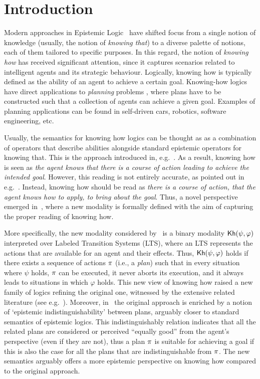 \section{Introduction}
\label{sec:intro}

Modern approaches in Epistemic Logic~\cite{vonWright:1951,Hintikka:1962} have shifted focus from a single notion of knowledge (usually, the notion of \emph{knowing that}) to a diverse palette of notions, each of them tailored to specific purposes. In this regard, the notion of \emph{knowing how} has received significant attention, since it captures scenarios related to intelligent agents and its strategic behaviour. Logically, knowing how is typically defined as the ability of an agent to achieve a certain goal.  Knowing-how logics have direct applications to \emph{planning} problems \cite{Stuart21},  where  plans have to be constructed such that a collection of agents can achieve a given goal.  Examples of planning applications can be found in self-driven cars,  robotics, software engineering, etc.

Usually,  the semantics for knowing how logics can be thought as as a combination of operators that describe abilities alongside standard epistemic operators for knowing that.  This is the approach introduced in, e.g.~\cite{Mccarthy69,Moore85,Les00,Hoek00,HerzigT06}. As a result, knowing how is seen as \emph{the agent knows that there is a course of action leading to achieve the intended goal}. However, this reading is not entirely accurate, as pointed out in e.g.~\cite{JamrogaA07,Herzig15}. Instead, knowing how should be read as \emph{there is a course of action, that the agent knows how to apply, to bring about the goal}. Thus, a novel perspective emerged in~\cite{Wang15lori,Wang16,Wang2016}, where a new modality is formally defined with the aim of capturing the proper reading of knowing how. 

More specifically, the new modality considered by~\cite{Wang15lori,Wang16,Wang2016} is a binary modality ${\mathsf{Kh}}(\psi,\varphi)$ interpreted over Labeled Transition Systems (LTS), where an LTS represents the  actions that are available for an agent and their effects. Thus, ${\mathsf{Kh}}(\psi,\varphi)$ holds if there exists a sequence of actions $\pi$ (i.e., a \emph{plan}) such that in every situation where $\psi$ holds, $\pi$ can be executed, it never aborts its execution, and it always leads to situations in which $\varphi$ holds. This new view of knowing how raised a new family of logics refining the original one, witnessed by the extensive related literature (see e.g.~\cite{LiWang17,Li17,Li17bis,FervariHLW17,LiW21,NaumovT18,NaumovT19,Naumov2018a}). Moreover, in~\cite{AFSVQ21,AFSVQ23} the original approach is enriched by a notion of `epistemic indistinguishability' between plans, arguably closer to standard semantics of epistemic logics. This indistinguishably relation indicates that all the related plans are considered or perceived ``equally good''
from the agent's perspective (even if they are not), thus a plan $\pi$ is suitable for achieving a goal if this is also the case for all the plans that are indistinguishable from $\pi$. The new semantics arguably offers a more epistemic perspective on knowing how compared to the original approach.

